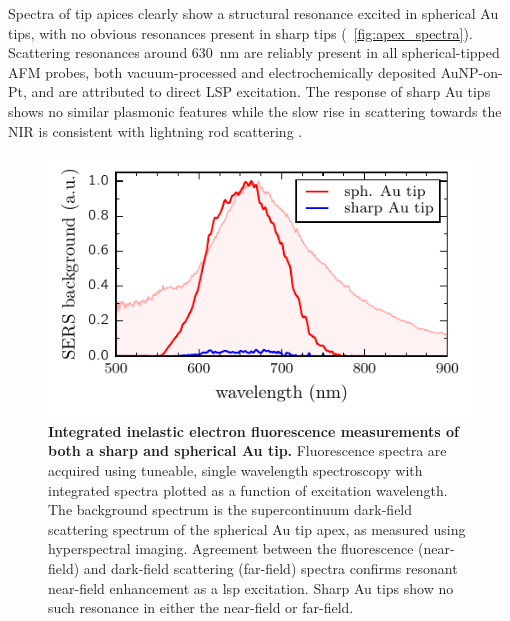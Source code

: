 \documentclass{article}
\begin{document}
Spectra of tip apices clearly show a structural resonance excited in spherical Au tips, with no obvious resonances present in sharp tips (\figurename~\ref{fig:apex_spectra}). Scattering resonances around \SI{630}{nm} are reliably present in all spherical-tipped AFM probes, both vacuum-processed and electrochemically deposited AuNP-on-Pt, and are attributed to direct LSP excitation. The response of sharp Au tips shows no similar plasmonic features while the slow rise in scattering towards the NIR is consistent with lightning rod scattering \cite{zhang2009}.

\begin{figure}[bt]
\centering
\includegraphics{figures/lsp_confirmation}
\caption[Integrated inelastic electron fluorescence measurements of both a sharp and spherical Au tip]{\textbf{Integrated inelastic electron fluorescence measurements of both a sharp and spherical Au tip.} Fluorescence spectra are acquired using tuneable, single wavelength spectroscopy with integrated spectra plotted as a function of excitation wavelength. The background spectrum is the supercontinuum dark-field scattering spectrum of the spherical Au tip apex, as measured using hyperspectral imaging. Agreement between the fluorescence (near-field) and dark-field scattering (far-field) spectra confirms resonant near-field enhancement as a \gls{lsp} excitation. Sharp Au tips show no such resonance in either the near-field or far-field.}
\label{fig:lsp_confirmation}
\vspace{-5pt}
\end{figure}
\end{document}

